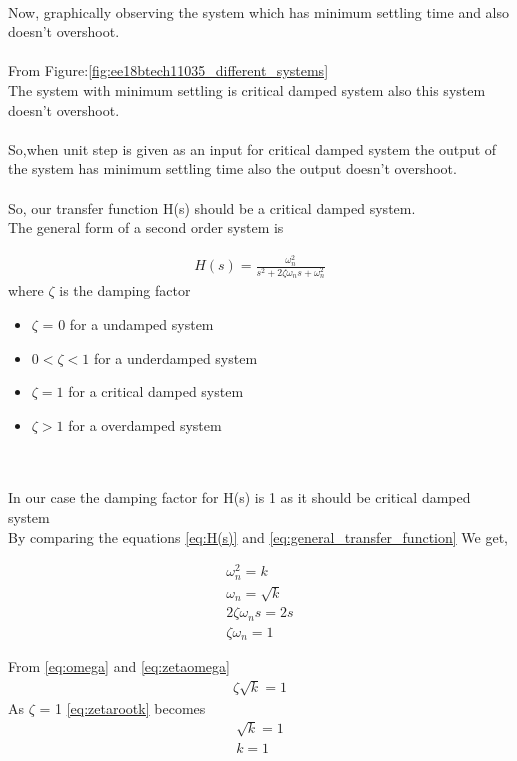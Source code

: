 \begin{enumerate}[label=\thesection.\arabic*.,ref=\thesection.\theenumi]
\\Now, graphically observing the system which has minimum settling time and also doesn't overshoot.\\
\\From Figure:\eqref{fig:ee18btech11035_different_systems}
\\The system with minimum settling is critical damped system also this system doesn't overshoot.
\\
\\
So,when unit step is given as an input for critical damped system the output of the system has minimum settling time also the output doesn't overshoot.\\
\\
So, our transfer function H(s) should be a critical damped system.\\
The general form of a second order system is 

\begin{align}
H(s) = \frac{\omega_n^2}{s^2+2\zeta\omega_ns+\omega_n^2}
\label{eq:general_transfer_function}
\end{align}
where \(\zeta \)  is the damping factor \\
\begin{itemize}
\item \(\zeta \) = 0 for a undamped system
\item \(0 < \zeta  < 1\) for a underdamped system
\item \(\zeta  = 1\) for a critical damped system
\item \(\zeta  > 1\) for a overdamped system
\end{itemize}
\\
\\
In our case the damping factor for H(s) is 1 as it should be critical damped system \\

By comparing the equations \eqref{eq:H(s)} and \eqref{eq:general_transfer_function}
We get,

\begin{align}
\omega_n^2 = k\\
\label{eq:omega}
\omega_n = \sqrt{k}\\
2\zeta\omega_ns = 2s\\
\label{eq:zetaomega}
\zeta\omega_n = 1
\end{align}

From \eqref{eq:omega} and \eqref{eq:zetaomega} \\
\begin{align}
\zeta\sqrt{k} = 1
\label{eq:zetarootk}
\end{align}
As \(\zeta\) = 1 \eqref{eq:zetarootk} becomes 
\begin{align}
\sqrt{k} = 1\\
k = 1
\end{align}


\end{enumerate}
